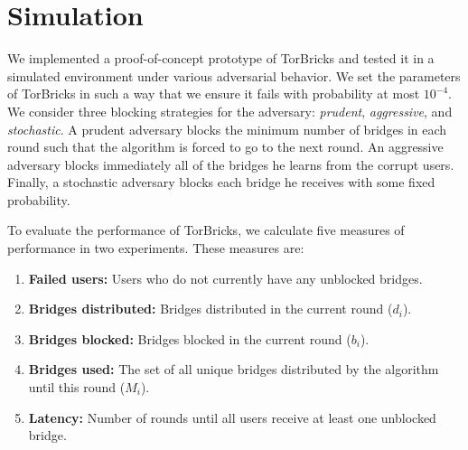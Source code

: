 \documentclass[letterpaper,twocolumn,10pt]{article}
\newcommand{\bricks}{}
\def\bricks/{\mbox{TorBricks}}
\newcommand{\sfsize}{\fontsize{0.68\baselineskip}{0.68\baselineskip}\selectfont}
\newcommand{\sans}[1]{\textbf{\textsf{\sfsize \mbox{#1}}}}
\begin{document}
\section{Simulation} \label{sec:simulations}
We implemented a proof-of-concept prototype of \bricks/ and tested it in a simulated environment under various adversarial behavior. %
We set the parameters of \bricks/ in such a way that we ensure it fails with probability at most $10^{-4}$. 
We consider three blocking strategies for the adversary: \emph{prudent}, \emph{aggressive}, and \emph{stochastic}. A prudent adversary blocks the minimum number of bridges in each round such that the algorithm is forced to go to the next round. An aggressive adversary blocks immediately all of the bridges he learns from the corrupt users. Finally, a stochastic adversary blocks each bridge he receives with some fixed probability.

To evaluate the performance of \bricks/, we calculate five measures of performance in two experiments. These measures are:

\begin{enumerate}[itemsep=0.4em, topsep=0.55em]
	\item \textbf{Failed users:} Users who do not currently have any unblocked bridges. \label{measure:thirsty}
	\item \textbf{Bridges distributed:} Bridges distributed in the current round ($d_i$). \label{measure:d_i}
	\item \textbf{Bridges blocked:} Bridges blocked in the current round ($b_i$). \label{measure:b_i}
	\item \textbf{Bridges used:} The set of all unique bridges distributed by the algorithm until this round ($M_i$). \label{measure:M_i}
	\item \textbf{Latency:} Number of rounds until all users receive at least one unblocked bridge. \label{measure:latency}
\end{enumerate}
\end{document}
